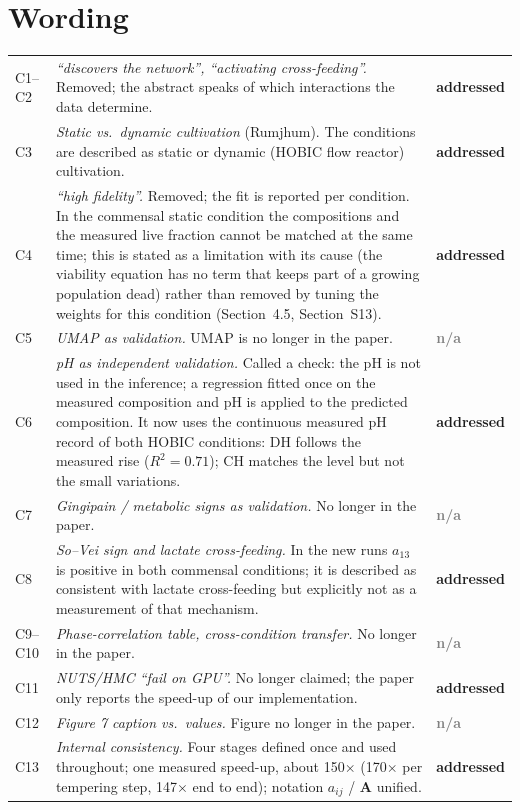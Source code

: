 \documentclass[11pt,a4paper]{article}
\newcommand{\done}{\textcolor{green!45!black}{\textbf{addressed}}}
\newcommand{\na}{\textcolor{gray}{\textbf{n/a}}}
\begin{document}
\section*{Wording}
\begin{tabularx}{\textwidth}{@{}l Y l@{}}
\toprule
C1--C2 & \emph{``discovers the network'', ``activating cross-feeding''.} Removed; the abstract speaks of which interactions the data determine. & \done\\
C3 & \emph{Static vs.\ dynamic cultivation} (Rumjhum). The conditions are described as static or dynamic (HOBIC flow reactor) cultivation. & \done\\
C4 & \emph{``high fidelity''.} Removed; the fit is reported per condition. In the commensal static condition the compositions and the measured live fraction cannot be matched at the same time; this is stated as a limitation with its cause (the viability equation has no term that keeps part of a growing population dead) rather than removed by tuning the weights for this condition (Section~4.5, Section~S13). & \done\\
C5 & \emph{UMAP as validation.} UMAP is no longer in the paper. & \na\\
C6 & \emph{pH as independent validation.} Called a check: the pH is not used in the inference; a regression fitted once on the measured composition and pH is applied to the predicted composition. It now uses the continuous measured pH record of both HOBIC conditions: DH follows the measured rise ($R^2=0.71$); CH matches the level but not the small variations. & \done\\
C7 & \emph{Gingipain / metabolic signs as validation.} No longer in the paper. & \na\\
C8 & \emph{So--Vei sign and lactate cross-feeding.} In the new runs $a_{13}$ is positive in both commensal conditions; it is described as consistent with lactate cross-feeding but explicitly not as a measurement of that mechanism. & \done\\
C9--C10 & \emph{Phase-correlation table, cross-condition transfer.} No longer in the paper. & \na\\
C11 & \emph{NUTS/HMC ``fail on GPU''.} No longer claimed; the paper only reports the speed-up of our implementation. & \done\\
C12 & \emph{Figure 7 caption vs.\ values.} Figure no longer in the paper. & \na\\
C13 & \emph{Internal consistency.} Four stages defined once and used throughout; one measured speed-up, about 150$\times$ (170$\times$ per tempering step, 147$\times$ end to end); notation $a_{ij}$ / $\mathbf{A}$ unified. & \done\\

\end{tabularx}
\end{document}
